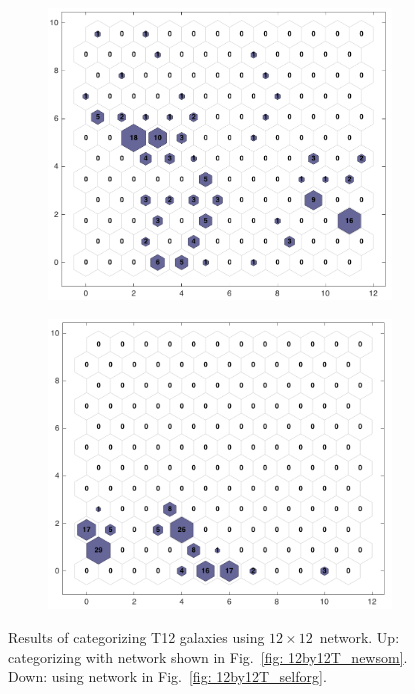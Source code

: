        \begin{figure}
        \begin{subfigure}[b]{0.5\textwidth}
            \centering
            \includegraphics[width=\textwidth]{../images/2d/hit_v_12_by_12.png}
        \end{subfigure}
        \hfill
        \begin{subfigure}[b]{0.5\textwidth}
            \includegraphics[width=\textwidth]{../images/2d/hit_v_12_by_self_org_res12.png}
        \end{subfigure}
        \caption{Results of categorizing T12 galaxies using $12\times12$~network. Up: categorizing with network shown in Fig.~\ref{fig: 12by12T_newsom}. Down: using network in Fig.~\ref{fig: 12by12T_selforg}.}
        \label{fig: 12by12V}
    \end{figure} 
    
